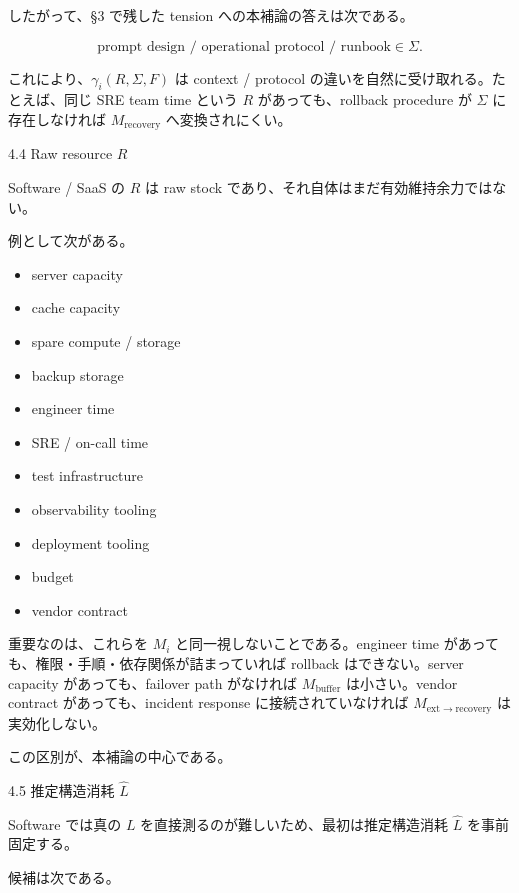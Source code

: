 \documentclass[12pt,a4paper]{article}
\begin{document}
したがって、§3 で残した tension への本補論の答えは次である。

\[
\text{prompt design / operational protocol / runbook} \in \Sigma.
\]

これにより、\(\gamma_i(R,\Sigma,F)\) は context / protocol の違いを自然に受け取れる。たとえば、同じ SRE team time という \(R\) があっても、rollback procedure が \(\Sigma\) に存在しなければ \(M_{\mathrm{recovery}}\) へ変換されにくい。

4.4 Raw resource \(R\)

Software / SaaS の \(R\) は raw stock であり、それ自体はまだ有効維持余力ではない。

例として次がある。

\begin{itemize}
\tightlist
\item
  server capacity
\item
  cache capacity
\item
  spare compute / storage
\item
  backup storage
\item
  engineer time
\item
  SRE / on-call time
\item
  test infrastructure
\item
  observability tooling
\item
  deployment tooling
\item
  budget
\item
  vendor contract
\end{itemize}

重要なのは、これらを \(M_i\) と同一視しないことである。engineer time があっても、権限・手順・依存関係が詰まっていれば rollback はできない。server capacity があっても、failover path がなければ \(M_{\mathrm{buffer}}\) は小さい。vendor contract があっても、incident response に接続されていなければ \(M_{\mathrm{ext}\to\mathrm{recovery}}\) は実効化しない。

この区別が、本補論の中心である。

4.5 推定構造消耗 \(\hat L\)

Software では真の \(L\) を直接測るのが難しいため、最初は推定構造消耗 \(\hat L\) を事前固定する。

候補は次である。
\end{document}
